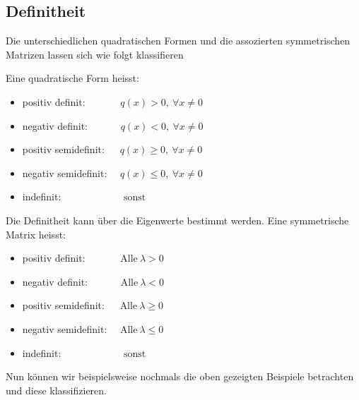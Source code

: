 \subsection{Definitheit}

Die unterschiedlichen quadratischen Formen und die assozierten symmetrischen Matrizen lassen sich wie folgt klassifieren

\begin{tcolorbox}[colback=gray!30, colframe=gray!80, title=Definitheit quadratischer Formen]
    Eine quadratische Form heisst:
    \begin{itemize}
        \item positiv definit: \( \qquad \quad \ q(x) > 0, \ \forall x \neq 0 \)
        \item negativ definit: \( \qquad \quad q(x) < 0, \ \forall x \neq 0 \)
        \item positiv semidefinit: \( \quad \ q(x) \geq 0, \ \forall x \neq 0 \)
        \item negativ semidefinit: \( \quad q(x) \leq 0, \ \forall x \neq 0 \)
        \item indefinit: \( \qquad \qquad \qquad \text{sonst} \)
    \end{itemize}
\end{tcolorbox}

\begin{tcolorbox}[colback=gray!30, colframe=gray!80, title=Definitheit symmetrischer Matrizen]
    Die Definitheit kann über die Eigenwerte bestimmt werden. Eine symmetrische Matrix heisst:
    \begin{itemize}
        \item positiv definit: \( \qquad \quad \ \text{Alle} \ \lambda > 0 \)
        \item negativ definit: \( \qquad \quad \text{Alle} \ \lambda < 0 \)
        \item positiv semidefinit: \( \quad \ \text{Alle} \ \lambda \geq 0 \)
        \item negativ semidefinit: \( \quad \text{Alle} \ \lambda \leq 0 \)
        \item indefinit: \( \qquad \qquad \qquad \text{sonst} \)
    \end{itemize}
\end{tcolorbox}

Nun können wir beispielsweise nochmals die oben gezeigten Beispiele betrachten und diese klassifizieren.

